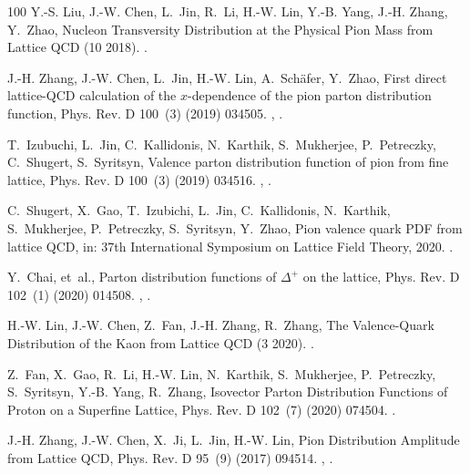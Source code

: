 \begin{thebibliography}{100}
Y.-S. Liu, J.-W. Chen, L.~Jin, R.~Li, H.-W. Lin, Y.-B. Yang, J.-H. Zhang,
  Y.~Zhao, {Nucleon Transversity Distribution at the Physical Pion Mass from
  Lattice QCD} (10 2018).
\newblock \href {http://arxiv.org/abs/1810.05043} {}.

J.-H. Zhang, J.-W. Chen, L.~Jin, H.-W. Lin, A.~Sch\"afer, Y.~Zhao, {First
  direct lattice-QCD calculation of the $x$-dependence of the pion parton
  distribution function}, Phys. Rev. D 100~(3) (2019) 034505.
\newblock \href {http://arxiv.org/abs/1804.01483} {},
  \href {https://doi.org/10.1103/PhysRevD.100.034505}
  {}.

T.~Izubuchi, L.~Jin, C.~Kallidonis, N.~Karthik, S.~Mukherjee, P.~Petreczky,
  C.~Shugert, S.~Syritsyn, {Valence parton distribution function of pion from
  fine lattice}, Phys. Rev. D 100~(3) (2019) 034516.
\newblock \href {http://arxiv.org/abs/1905.06349} {},
  \href {https://doi.org/10.1103/PhysRevD.100.034516}
  {}.

C.~Shugert, X.~Gao, T.~Izubichi, L.~Jin, C.~Kallidonis, N.~Karthik,
  S.~Mukherjee, P.~Petreczky, S.~Syritsyn, Y.~Zhao, {Pion valence quark PDF
  from lattice QCD}, in: {37th International Symposium on Lattice Field
  Theory}, 2020.
\newblock \href {http://arxiv.org/abs/2001.11650} {}.

Y.~Chai, et~al., {Parton distribution functions of $\Delta^+$ on the lattice},
  Phys. Rev. D 102~(1) (2020) 014508.
\newblock \href {http://arxiv.org/abs/2002.12044} {},
  \href {https://doi.org/10.1103/PhysRevD.102.014508}
  {}.

H.-W. Lin, J.-W. Chen, Z.~Fan, J.-H. Zhang, R.~Zhang, {The Valence-Quark
  Distribution of the Kaon from Lattice QCD} (3 2020).
\newblock \href {http://arxiv.org/abs/2003.14128} {}.

Z.~Fan, X.~Gao, R.~Li, H.-W. Lin, N.~Karthik, S.~Mukherjee, P.~Petreczky,
  S.~Syritsyn, Y.-B. Yang, R.~Zhang, {Isovector Parton Distribution Functions
  of Proton on a Superfine Lattice}, Phys. Rev. D 102~(7) (2020) 074504.
\newblock \href {http://arxiv.org/abs/2005.12015} {}.

J.-H. Zhang, J.-W. Chen, X.~Ji, L.~Jin, H.-W. Lin, {Pion Distribution Amplitude
  from Lattice QCD}, Phys. Rev. D 95~(9) (2017) 094514.
\newblock \href {http://arxiv.org/abs/1702.00008} {},
  \href {https://doi.org/10.1103/PhysRevD.95.094514}
  {}.


\end{thebibliography}
